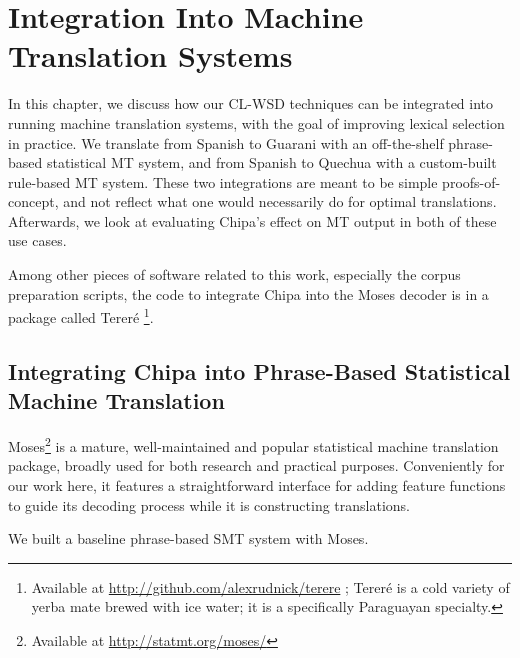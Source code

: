 \chapter{Integration Into Machine Translation Systems}
\label{chap:integration}

In this chapter, we discuss how our CL-WSD techniques can be integrated into
running machine translation systems, with the goal of improving lexical
selection in practice. We translate from Spanish to Guarani with an
off-the-shelf phrase-based statistical MT system, and from Spanish to Quechua
with a custom-built rule-based MT system. These two integrations are meant to
be simple proofs-of-concept, and not reflect what one would necessarily do for
optimal translations.
Afterwards, we look at evaluating Chipa's effect on MT output in both of these
use cases.

Among other pieces of software related to this work, especially the corpus
preparation scripts, the code to integrate Chipa into the Moses decoder is in a
package called Tereré \footnote{Available at
\url{http://github.com/alexrudnick/terere} ; Tereré is a cold variety of yerba
mate brewed with ice water; it is a specifically Paraguayan specialty.}.


\section{Integrating Chipa into Phrase-Based Statistical Machine Translation}
\label{sec:terere}

Moses\footnote{Available at
\url{http://statmt.org/moses/}}\cite{koehn-EtAl:2007:PosterDemo} is a mature,
well-maintained and popular statistical machine translation package, broadly
used for both research and practical purposes. Conveniently for our work here,
it features a straightforward interface for adding feature functions to guide
its decoding process while it is constructing translations.

We built a baseline phrase-based SMT system with Moses.

